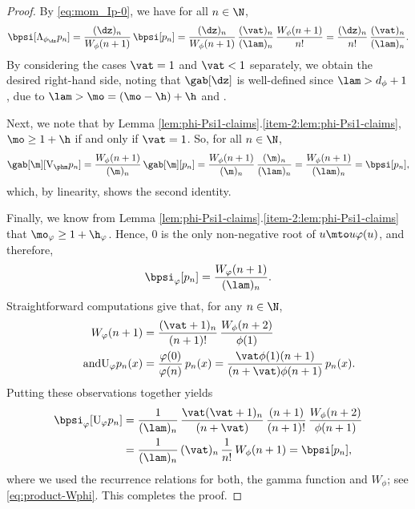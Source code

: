 \begin{proof}
By \eqref{eq:mom_Ip-0}, we have for all $n \in \N$,
\begin{equation*}
\bpsi[\Lambda_{\phi_{\dz}} p_n] = \frac{(\dz)_n}{W_{\phi}(n+1)}\, \bpsi[p_n]=
\frac{(\dz)_n}{W_{\phi}(n+1)}\, \frac{(\vat)_n}{(\lam)_n}\,\frac{W_{\phi}(n+1)}{n!} =\frac{(\dz)_n}{n!}\, \frac{(\vat)_n}{(\lam)_n}.
\end{equation*}
By considering the cases $\vat=1$ and $\vat<1$ separately, we obtain the desired right-hand side, noting that $\gab[\dz]$ is well-defined since $\lam > d_\phi +1$, due to $ \lam > \mo = (\mo-\h) + \h$ and \cite[Prop.\,4.4(1)]{Patie-Savov-GeL}.

Next, we note that by Lemma \ref{lem:phi-Psi1-claims}.\eqref{item-2:lem:phi-Psi1-claims},
$\mo \geq 1+\h$ if and only if $\vat = 1$. So, for all $n \in \N$,
\begin{equation*}
\gab[\m] [\mathrm{V}_{\phm} p_n] = \frac{W_{\phi}(n+1)}{(\m)_n}\, \gab[\m] [p_n] = \frac{W_{\phi}(n+1)}{(\m)_n}\, \frac{(\m)_n}{(\lam)_n} = \frac{W_{\phi}(n+1)}{(\lam)_n} = \bpsi[p_n],
\end{equation*}
which, by linearity, shows the second identity.

Finally, we know from Lemma \ref{lem:phi-Psi1-claims}.\eqref{item-2:lem:phi-Psi1-claims} that
$\mo_\varphi \geq 1+\h_\varphi$. Hence, $0$ is the only non-negative root of $u \mto u\varphi(u)$, and therefore,
\begin{equation*}
\bpsi_\varphi [p_n] = \frac{W_\varphi(n+1)}{(\lam)_n}.
\end{equation*}
Straightforward computations give that, for any $n \in \N$,
\begin{align*}
W_\varphi(n+1) &= \frac{(\vat+1)_{n}}{(n+1)!}\, \frac{W_\phi(n+2)}{\phi(1)} \\
\tag*{and} \mathrm{U}_\varphi p_n(x) &= \frac{\varphi(0)}{\varphi(n)}\, p_n(x) = \frac{\vat\phi(1)(n+1)}{(n+\vat)\phi(n+1)}\, p_n(x).
\end{align*}
Putting these observations together yields
\begin{align*}
\bpsi_\varphi[\mathrm{U}_\varphi p_n]&= \frac{1}{(\lam)_n}\, \frac{\vat (\vat+1)_{n}}{(n+\vat)}\, \frac{(n+1)}{(n+1)!}\, \frac{W_{\phi}(n+2)}{\phi(n+1)}\\
&=\frac{1}{(\lam)_n}\, (\vat)_n\, \frac{1}{n!}\, W_\phi(n+1) = \bpsi[p_n],
\end{align*}
where we used the recurrence relations for both, the gamma function and $W_\phi$; see \eg \eqref{eq:product-Wphi}.
This completes the proof.
\end{proof}

